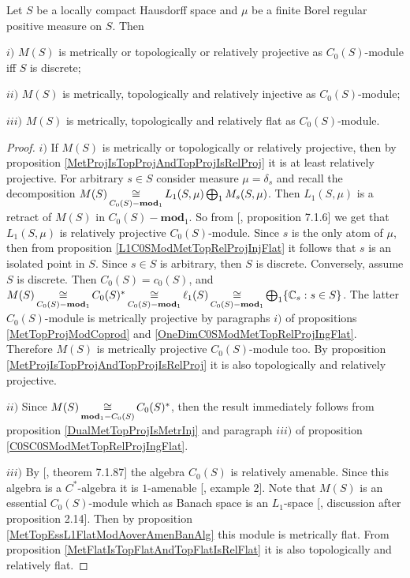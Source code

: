 \begin{proposition}\label{MSC0SModMetTopRelProjIngFlat}
Let $S$ be a locally compact Hausdorff space and $\mu$ be a finite Borel regular positive measure on $S$. Then

$i)$ $M(S)$ is metrically or topologically or relatively projective as $C_0(S)$-module iff $S$ is discrete; 

$ii)$ $M(S)$ is metrically, topologically and relatively injective as $C_0(S)$-module; 

$iii)$ $M(S)$ is metrically, topologically and relatively flat as $C_0(S)$-module.
\end{proposition}
\begin{proof} $i)$ If $M(S)$ is metrically or topologically or relatively projective, then by proposition \ref{MetProjIsTopProjAndTopProjIsRelProj} it is at least relatively projective. For arbitrary $s\in S$ consider measure $\mu=\delta_s$ and recall the decomposition $M(S)\mathop{\mathbin{\cong}}\limits_{C_0(S)-\mathbf{mod}_1}L_1(S,\mu)\bigoplus_1 M_s(S,\mu)$. Then $L_1(S,\mu)$ is a retract of $M(S)$ in $C_0(S)-\mathbf{mod}_1$. So from [\cite{HelBanLocConvAlg}, proposition 7.1.6] we get that $L_1(S,\mu)$ is relatively projective $C_0(S)$-module. Since $s$ is the only atom of $\mu$, then from proposition \ref{L1C0SModMetTopRelProjInjFlat} it follows that $s$ is an isolated point in $S$. Since $s\in S$ is arbitrary, then $S$ is discrete. Conversely, assume $S$ is discrete. Then $C_0(S)=c_0(S)$, and $M(S)\mathop{\mathbin{\cong}}\limits_{C_0(S)-\mathbf{mod}_1}C_0(S)^*\mathop{\mathbin{\cong}}\limits_{C_0(S)-\mathbf{mod}_1}\ell_1(S)\mathop{\mathbin{\cong}}\limits_{C_0(S)-\mathbf{mod}_1}\bigoplus_1\{\mathbb{C}_s:s\in S\}$. The latter $C_0(S)$-module is metrically projective by paragraphs $i)$ of propositions \ref{MetTopProjModCoprod} and \ref{OneDimC0SModMetTopRelProjIngFlat}. Therefore $M(S)$ is metrically projective $C_0(S)$-module too. By proposition \ref{MetProjIsTopProjAndTopProjIsRelProj} it is also topologically and relatively projective.

$ii)$ Since $M(S)\mathop{\mathbin{\cong}}\limits_{\mathbf{mod}_1-C_0(S)}C_0(S)^*$, then the result immediately follows from proposition \ref{DualMetTopProjIsMetrInj} and paragraph $iii)$ of proposition \ref{C0SC0SModMetTopRelProjIngFlat}.

$iii)$ By [\cite{HelBanLocConvAlg}, theorem 7.1.87] the algebra $C_0(S)$ is relatively amenable. Since this algebra is a $C^*$-algebra it is $1$-amenable [\cite{RundeAmenConstFour}, example 2]. Note that $M(S)$ is an essential $C_0(S)$-module which as Banach space is an $L_1$-space [\cite{DalLauSecondDualOfMeasAlg}, discussion after proposition 2.14]. Then by proposition \ref{MetTopEssL1FlatModAoverAmenBanAlg} this module is metrically flat. From proposition \ref{MetFlatIsTopFlatAndTopFlatIsRelFlat} it is also topologically and relatively flat.
\end{proof}

